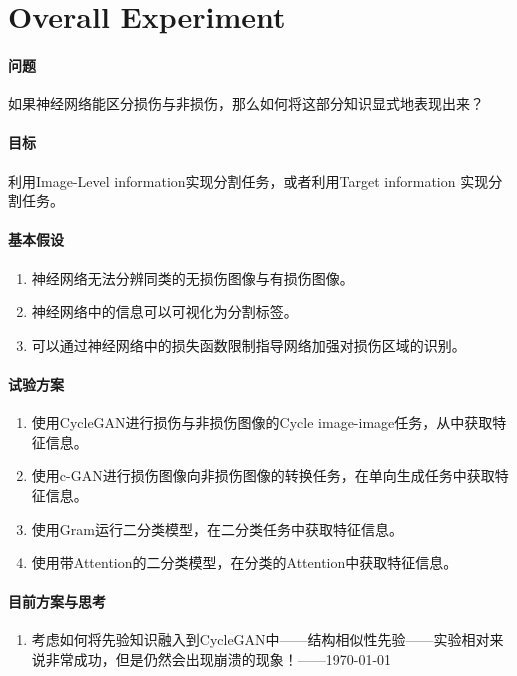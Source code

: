 \section{Overall Experiment}

\paragraph{问题}
如果神经网络能区分损伤与非损伤，那么如何将这部分知识显式地表现出来？

\paragraph{目标}
利用Image-Level information实现分割任务，或者利用Target information 实现分割任务。

\paragraph{基本假设}

\begin{enumerate}[1.]
	\item 神经网络无法分辨同类的无损伤图像与有损伤图像。
	\item 神经网络中的信息可以可视化为分割标签。
	\item 可以通过神经网络中的损失函数限制指导网络加强对损伤区域的识别。
\end{enumerate}

\paragraph{试验方案}

\begin{enumerate}[1.]
	\item {}使用CycleGAN进行损伤与非损伤图像的Cycle image-image任务，从中获取特征信息。
	\item 使用c-GAN进行损伤图像向非损伤图像的转换任务，在单向生成任务中获取特征信息。
	\item 使用Gram运行二分类模型，在二分类任务中获取特征信息。
	\item 使用带Attention的二分类模型，在分类的Attention中获取特征信息。

\end{enumerate}

\paragraph{目前方案与思考}
\begin{enumerate}[1]
	\item 考虑如何将先验知识融入到CycleGAN中——结构相似性先验——实验相对来说非常成功，但是仍然会出现崩溃的现象！——\mbox{\today}

\end{enumerate}

\newpage